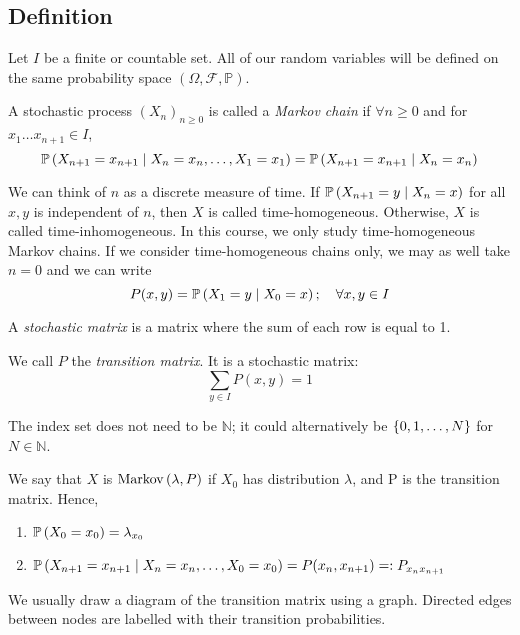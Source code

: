 \subsection{Definition}
Let \( I \) be a finite or countable set.
All of our random variables will be defined on the same probability space \( (\Omega, \mathcal F, \mathbb P) \).
\begin{definition}
	A stochastic process \( (X_n)_{n \geq 0} \) is called a \textit{Markov chain} if \( \forall n \geq 0 \) and for \( x_1 \dots x_{n+1} \in I \),
	\[
		\mathbb{P}\left({X_{n+1} = x_{n+1} \mid X_n = x_n, \dots,X_1 = x_1}\right) = \mathbb{P}\left({X_{n+1} = x_{n+1} \mid X_n = x_n}\right)
	\]
\end{definition}
\noindent We can think of \( n \) as a discrete measure of time.
If \( \mathbb{P}\left({X_{n+1} = y \mid X_n = x}\right) \) for all \( x, y \) is independent of \( n \), then \( X \) is called time-homogeneous.
Otherwise, \( X \) is called time-inhomogeneous.
In this course, we only study time-homogeneous Markov chains.
If we consider time-homogeneous chains only, we may as well take \( n = 0 \) and we can write
\[
	P(x,y) = \mathbb{P}\left({X_1 = y \mid X_0 = x}\right);\quad \forall x,y \in I
\]
\begin{definition}
	A \textit{stochastic matrix} is a matrix where the sum of each row is equal to 1.
\end{definition}
\noindent We call \( P \) the \textit{transition matrix}.
It is a stochastic matrix:
\[
	\sum_{y \in I} P(x,y) = 1
\]
\begin{remark}
	The index set does not need to be \( \mathbb N \); it could alternatively be \( \qty{0,1,\dots,N} \) for \( N \in \mathbb N \).
\end{remark}
\noindent We say that \( X \) is \(\operatorname{Markov}\left({\lambda, P}\right)\) if \( X_0 \) has distribution \(\lambda\), and P is the transition matrix.
Hence,
\begin{enumerate}
	\item \( \mathbb{P}\left({X_0 = x_0}\right) = \lambda_{x_0} \)
	\item \( \mathbb{P}\left({X_{n+1} = x_{n+1} \mid X_n = x_n, \dots, X_0 = x_0}\right) = P(x_n, x_{n+1}) =: P_{x_n x_{n+1}} \)
\end{enumerate}
We usually draw a diagram of the transition matrix using a graph.
Directed edges between nodes are labelled with their transition probabilities.

